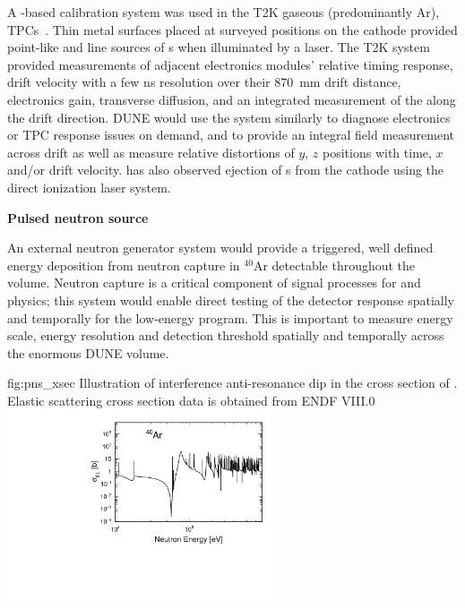 A \phel{}-based calibration system was used in the T2K gaseous (predominantly Ar), TPCs~\cite{Abgrall:2010hi}. 
Thin metal surfaces placed at surveyed positions on the cathode provided point-like and line sources of \phel{}s when illuminated by a laser. The T2K \phel system provided measurements 
of adjacent electronics modules' relative timing response, drift velocity with a few \si{\nano\s} resolution over their \SI{870}{\milli\m} drift distance, electronics gain, 
transverse diffusion, and an integrated measurement of the \efield along the drift direction. DUNE would use the system similarly to diagnose electronics or TPC response issues on demand, and to provide an integral field measurement across drift as well as measure relative distortions of $y$, $z$ positions with time, $x$ and/or drift velocity. \microboone has also observed ejection of \phel{}s from the cathode using the direct ionization laser system. 

\textbf{Pulsed neutron source} 

An external neutron generator system would provide a triggered, well defined energy deposition from neutron capture in $^{40}$Ar detectable throughout the  volume. Neutron capture is a critical component of signal processes for  and  physics; this system would enable direct testing of the detector response  spatially and temporally for the low-energy program.  This is important to measure energy scale, energy resolution and detection threshold spatially and temporally across the enormous DUNE volume.

\begin{dunefigure}{fig:pns_xsec}
{Illustration of interference anti-resonance dip in the cross section of  . Elastic scattering cross section data is obtained from ENDF VIII.0}
\includegraphics[width=8cm]{graphics/Calib_pns_ES_xsec_Ar40.pdf}
\end{dunefigure}

